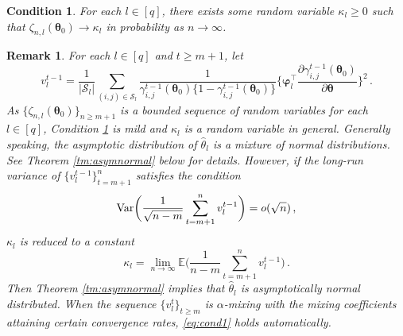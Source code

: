 \documentclass[12pt]{article}
\newtheorem{condition}{Condition}
\newtheorem{remark}{Remark}
\newcommand{\btheta}{\boldsymbol \theta}
\newcommand{\bvarphi}{\boldsymbol \varphi}
\def\T{{\scriptscriptstyle \top} }
\newcommand{\0}{{\bf 0}}
\begin{document}
\begin{condition}\label{as:conv}
For each $l\in[q]$, there exists some random variable $\kappa_l\geq0$ such that
$
\zeta_{n,l}(\btheta_0)\rightarrow\kappa_l$ in probability as $n\rightarrow\infty$.
\end{condition}

\begin{remark}
For each $l\in [q]$ and $t\geq m+1$,
let \[
v_{l}^{t-1}=\frac{1}{|\mathcal{S}_l|}\sum_{(i,j)\in\mathcal{S}_l}\frac{1}{\gamma_{i,j}^{t-1}(\btheta_0)\{1-\gamma_{i,j}^{t-1}(\btheta_0)\}}\bigg\{\bvarphi_l^{\T}\frac{\partial\gamma_{i,j}^{t-1}(\btheta_0)}{\partial\btheta}\bigg\}^2\,.
\]
As $\{\zeta_{n,l}(\btheta_0)\}_{n\geq m+1}$ is a bounded sequence of random variables for each $l\in[q]$, Condition {\rm\ref{as:conv}} is mild and $\kappa_l$ is a random variable in general. Generally speaking, the asymptotic distribution
of $\hat \theta_l$ is a mixture of normal distributions. See Theorem {\rm\ref{tm:asymnormal}} below for details. However, if the long-run variance of $\{v_l^{t-1}\}_{t=m+1}^n$ satisfies the condition
\begin{align}\label{eq:cond1}
{\rm Var}\bigg(\frac{1}{\sqrt{n-m}}\sum_{t=m+1}^nv_l^{t-1}\bigg)=o(\sqrt{n})\,,
\end{align}
$\kappa_l$ is reduced to a constant 
$$
\kappa_l=\lim_{n\rightarrow\infty}\mathbb{E}\bigg(\frac{1}{n-m}\sum_{t=m+1}^nv_{l}^{t-1}\bigg)\,.
$$
Then Theorem {\rm\ref{tm:asymnormal}} implies that $\hat \theta_l$ is asymptotically normal distributed. When the sequence
$\{v_{l}^{t}\}_{t\ge m} $ is $\alpha$-mixing with the mixing coefficients 
attaining certain convergence rates, \eqref{eq:cond1} holds automatically. 

\end{remark}
\end{document}

